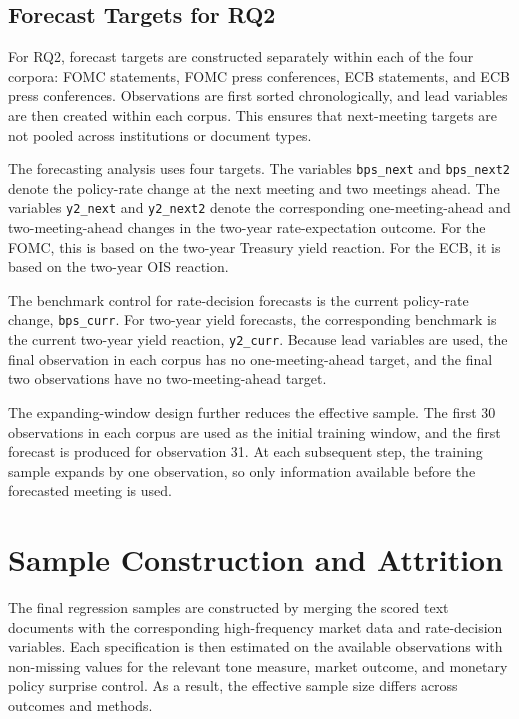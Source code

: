 \subsection{Forecast Targets for RQ2}
\label{sec:data_rate_rq2}

For RQ2, forecast targets are constructed separately within each of the
four corpora: FOMC statements, FOMC press conferences, ECB statements,
and ECB press conferences. Observations are first sorted chronologically,
and lead variables are then created within each corpus. This ensures
that next-meeting targets are not pooled across institutions or document
types.

The forecasting analysis uses four targets. The variables
\texttt{bps\_next} and \texttt{bps\_next2} denote the policy-rate change
at the next meeting and two meetings ahead. The variables
\texttt{y2\_next} and \texttt{y2\_next2} denote the corresponding
one-meeting-ahead and two-meeting-ahead changes in the two-year
rate-expectation outcome. For the FOMC, this is based on the two-year
Treasury yield reaction. For the ECB, it is based on the two-year OIS
reaction.

The benchmark control for rate-decision forecasts is the current
policy-rate change, \texttt{bps\_curr}. For two-year yield forecasts, the
corresponding benchmark is the current two-year yield reaction,
\texttt{y2\_curr}. Because lead variables are used, the final observation
in each corpus has no one-meeting-ahead target, and the final two
observations have no two-meeting-ahead target.

The expanding-window design further reduces the effective sample. The
first 30 observations in each corpus are used as the initial training
window, and the first forecast is produced for observation 31. At each
subsequent step, the training sample expands by one observation, so only
information available before the forecasted meeting is used.


\section{Sample Construction and Attrition}
\label{sec:data_sample}

The final regression samples are constructed by merging the scored text
documents with the corresponding high-frequency market data and
rate-decision variables. Each specification is then estimated on the
available observations with non-missing values for the relevant tone
measure, market outcome, and monetary policy surprise control. As a
result, the effective sample size differs across outcomes and methods.

